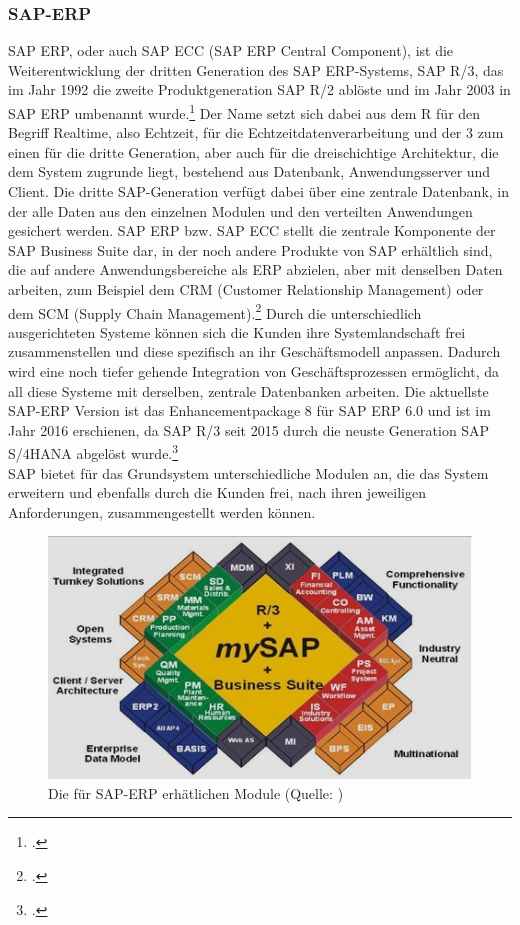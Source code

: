 \subsubsection{SAP-ERP}
\label{kap:R3}
SAP ERP, oder auch SAP ECC (SAP ERP Central Component), ist die Weiterentwicklung der dritten Generation des SAP ERP-Systems, \glqq{}SAP R/3\grqq{}, das im Jahr 1992 die zweite Produktgeneration \glqq{}SAP R/2\grqq{} ablöste und im Jahr 2003 in \glqq{}SAP ERP\grqq{} umbenannt wurde.\footcite[Vgl.][]{sap-unterschiede} Der Name setzt sich dabei aus dem \glqq{}R\grqq{} für den Begriff \glqq{}Realtime\grqq{}, also Echtzeit, für die Echtzeitdatenverarbeitung und der \glqq{}3\grqq{} zum einen für die dritte Generation, aber auch für die dreischichtige Architektur, die dem System zugrunde liegt, bestehend aus Datenbank, Anwendungsserver und Client. Die dritte SAP-Generation verfügt dabei über eine zentrale Datenbank, in der alle Daten aus den einzelnen Modulen und den verteilten Anwendungen gesichert werden. SAP ERP bzw. SAP ECC stellt die zentrale Komponente der \glqq{}SAP Business Suite\grqq{} dar, in der noch andere Produkte von SAP erhältlich sind, die auf andere Anwendungsbereiche als ERP abzielen, aber mit denselben Daten arbeiten, zum Beispiel dem CRM (Customer Relationship Management) oder dem SCM (Supply Chain Management).\footcite[Vgl.][]{mindsquare-sap} Durch die unterschiedlich ausgerichteten Systeme können sich die Kunden ihre Systemlandschaft frei zusammenstellen und diese spezifisch an ihr Geschäftsmodell anpassen. Dadurch wird eine noch tiefer gehende Integration von Geschäftsprozessen ermöglicht, da all diese Systeme mit derselben, zentrale Datenbanken arbeiten. Die aktuellste SAP-ERP Version ist das Enhancementpackage 8 für SAP ERP 6.0 und ist im Jahr 2016 erschienen, da \glqq{}SAP R/3\grqq{} seit 2015 durch die neuste Generation \glqq{}SAP S/4HANA\grqq{} abgelöst wurde.\footcite[Vgl.][]{sap-version}\\ SAP bietet für das Grundsystem unterschiedliche Modulen an, die das System erweitern und ebenfalls durch die Kunden frei, nach ihren jeweiligen Anforderungen, zusammengestellt werden können.

\begin{figure}[h!]
    \centering
    \includegraphics[scale=1]{Bilder/sap-module.jpg}
    \caption[Die Module von SAP-ERP]{Die für SAP-ERP erhätlichen Module (Quelle: \cite[][]{sap-module})}
    \label{fig:sapmodule}
\end{figure}

